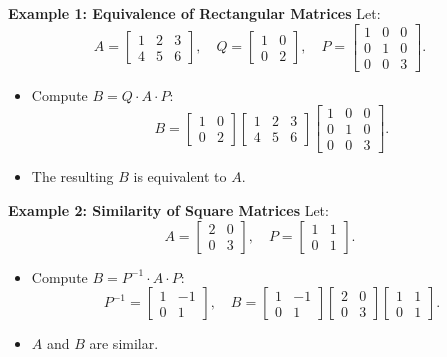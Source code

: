 \documentclass{article}
\begin{document}
\textbf{Example 1: Equivalence of Rectangular Matrices}
Let:
\[
  A =
  \begin{bmatrix}
    1 & 2 & 3 \\
    4 & 5 & 6
  \end{bmatrix}, \quad Q =
  \begin{bmatrix}
    1 & 0 \\
    0 & 2
  \end{bmatrix}, \quad P =
  \begin{bmatrix}
    1 & 0 & 0 \\
    0 & 1 & 0 \\
    0 & 0 & 3
  \end{bmatrix}.
\]
\begin{itemize}
  \item Compute $B = Q \cdot A \cdot P$:
    \[
      B =
      \begin{bmatrix}
        1 & 0 \\
        0 & 2
      \end{bmatrix}
      \begin{bmatrix}
        1 & 2 & 3 \\
        4 & 5 & 6
      \end{bmatrix}
      \begin{bmatrix}
        1 & 0 & 0 \\
        0 & 1 & 0 \\
        0 & 0 & 3
      \end{bmatrix}.
    \]
  \item The resulting $B$ is equivalent to $A$.
\end{itemize}

\textbf{Example 2: Similarity of Square Matrices}
Let:
\[
  A =
  \begin{bmatrix}
    2 & 0 \\
    0 & 3
  \end{bmatrix}, \quad P =
  \begin{bmatrix}
    1 & 1 \\
    0 & 1
  \end{bmatrix}.
\]
\begin{itemize}
  \item Compute $B = P^{-1} \cdot A \cdot P$:
    \[
      P^{-1} =
      \begin{bmatrix}
        1 & -1 \\
        0 & 1
      \end{bmatrix}, \quad B =
      \begin{bmatrix}
        1 & -1 \\
        0 & 1
      \end{bmatrix}
      \begin{bmatrix}
        2 & 0 \\
        0 & 3
      \end{bmatrix}
      \begin{bmatrix}
        1 & 1 \\
        0 & 1
      \end{bmatrix}.
    \]
  \item $A$ and $B$ are similar.
\end{itemize}
\end{document}
